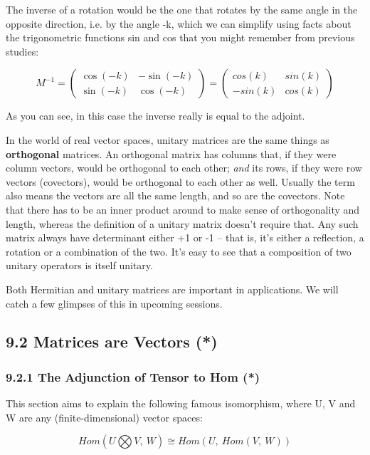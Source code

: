 \documentclass[oneside,english]{amsbook}
\numberwithin{section}{chapter}
\theoremstyle{plain}
\theoremstyle{definition}
\begin{document}
The inverse of a rotation would be the one that rotates by the same
angle in the opposite direction, i.e. by the angle -k, which we can
simplify using facts about the trigonometric functions sin and cos that
you might remember from previous studies:

\[{M^{- 1} = \begin{pmatrix}
		\cos( - k) & - \sin( - k) \\
		\sin( - k) & \cos( - k)
	\end{pmatrix}
}{= \begin{pmatrix}
		cos(k) & sin(k) \\
		- sin(k) & cos(k)
\end{pmatrix}}\]

As you can see, in this case the inverse really is equal to the adjoint.

In the world of real vector spaces, unitary matrices are the same things
as \textbf{orthogonal} matrices. An orthogonal matrix has columns that,
if they were column vectors, would be orthogonal to each other;
\emph{and} its rows, if they were row vectors (covectors), would be
orthogonal to each other as well. Usually the term also means the
vectors are all the same length, and so are the covectors. Note that
there has to be an inner product around to make sense of orthogonality
and length, whereas the definition of a unitary matrix doesn't require
that. Any such matrix always have determinant either +1 or -1 -- that
is, it's either a reflection, a rotation or a combination of the two.
It's easy to see that a composition of two unitary operators is itself
unitary.

Both Hermitian and unitary matrices are important in applications. We
will catch a few glimpses of this in upcoming sessions.

\subsection{9.2 Matrices are Vectors (*)}\label{matrices-are-vectors}

\subsubsection{9.2.1 The Adjunction of Tensor to Hom
	(*)}\label{the-adjunction-of-tensor-to-hom}

This section aims to explain the following famous isomorphism, where U,
V and W are any (finite-dimensional) vector spaces:

\[Hom(U\bigotimes V,\ W) \cong Hom(U,\ Hom(V,\ W))\]
\end{document}
